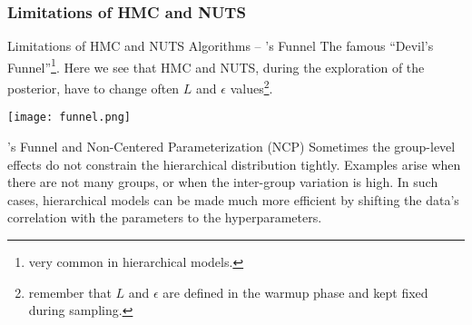 \subsubsection{Limitations of HMC and NUTS}
\begin{frame}{Limitations of HMC and NUTS Algorithms -- \textcite{nealSliceSampling2003}'s Funnel}
	The famous ``Devil's Funnel''\footnote{very common in hierarchical models.}.
	Here we see that HMC and NUTS, during the exploration of the posterior,
	have to change often $L$ and $\epsilon$ values\footnote{
		remember that $L$ and $\epsilon$ are defined in the warmup phase and kept fixed during sampling.}.




	\centering
	\texttt{[image: funnel.png]}
\end{frame}

\begin{frame}{\textcite{nealSliceSampling2003}'s Funnel and Non-Centered Parameterization (NCP)}
	Sometimes the group-level effects do not constrain the hierarchical distribution tightly.
	\vfill
	Examples arise when there are not many groups,
	or when the inter-group variation is high.
	\vfill
	In such cases, hierarchical models can be made much more efficient by shifting the
	data's correlation with the parameters to the hyperparameters.
\end{frame}

